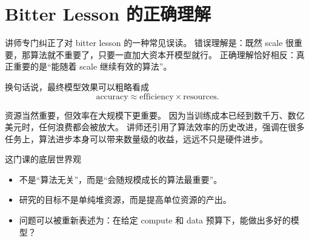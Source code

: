 \section{Bitter Lesson 的正确理解}

讲师专门纠正了对 bitter lesson 的一种常见误读。
错误理解是：既然 scale 很重要，那算法就不重要了，只要一直加大资本开模型就行。
正确理解恰好相反：真正重要的是“能随着 scale 继续有效的算法”。

换句话说，最终模型效果可以粗略看成
\[
\text{accuracy} \approx \text{efficiency} \times \text{resources}.
\]

资源当然重要，但效率在大规模下更重要。
因为当训练成本已经到数千万、数亿美元时，任何浪费都会被放大。
讲师还引用了算法效率的历史改进，强调在很多任务上，算法进步本身可以带来数量级的收益，远远不只是硬件进步。

\begin{knowledgebox}{这门课的底层世界观}
\begin{itemize}
    \item 不是“算法无关”，而是“会随规模成长的算法最重要”。
    \item 研究的目标不是单纯堆资源，而是提高单位资源的产出。
    \item 问题可以被重新表述为：在给定 compute 和 data 预算下，能做出多好的模型？
\end{itemize}
\end{knowledgebox}

